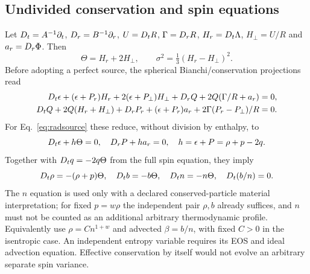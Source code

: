 \subsection{Undivided conservation and spin equations}
Let $D_t=A^{-1}\partial_t$, $D_r=B^{-1}\partial_r$, $U=D_t R$, $\Gamma=D_r R$, $H_r=D_t\Lambda$, $H_\perp=U/R$ and $a_r=D_r\Phi$. Then
\begin{equation}
 \Theta=H_r+2H_\perp,\qquad \sigma^2=\tfrac13(H_r-H_\perp)^2.
\end{equation}
Before adopting a perfect source, the spherical Bianchi/conservation projections read
\begin{align}
 D_t\epsilon+(\epsilon+P_r)H_r+2(\epsilon+P_\perp)H_\perp
 +D_r Q+2Q(\Gamma/R+a_r)&=0,\label{eq:generalenergy}\\
 D_t Q+2Q(H_r+H_\perp)+D_r P_r+(\epsilon+P_r)a_r
 +2\Gamma(P_r-P_\perp)/R&=0.\label{eq:generalmomentum}
\end{align}
For Eq.~\eqref{eq:radsource} these reduce, without division by enthalpy, to
\begin{equation}
 D_t\epsilon+h\Theta=0,\quad D_r P+h a_r=0,\quad h=\epsilon+P=\rho+p-2q.
\end{equation}
Together with $D_t q=-2q\Theta$ from the full spin equation, they imply
\begin{equation}
 D_t\rho=-(\rho+p)\Theta,\quad D_t b=-b\Theta,\quad
 D_t n=-n\Theta,\quad D_t(b/n)=0.\label{eq:material}
\end{equation}
The $n$ equation is used only with a declared conserved-particle material interpretation; for fixed $p=w\rho$ the independent pair $\rho,b$ already suffices, and $n$ must not be counted as an additional arbitrary thermodynamic profile. Equivalently use $\rho=C n^{1+w}$ and advected $\beta=b/n$, with fixed $C>0$ in the isentropic case. An independent entropy variable requires its EOS and ideal advection equation. Effective conservation by itself would not evolve an arbitrary separate spin variance.

